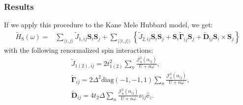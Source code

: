 \documentclass{beamer}
\newcommand{\bs}[1] {\boldsymbol{#1}}
\begin{document}

\begin{frame}
\frametitle{Results}
If we apply this procedure to the Kane Mele Hubbard model, we get:
\begin{align*}
\tilde{H}_{\text{S}}(\omega) =& \sum_{\langle i,j \rangle} \tilde{J}_{1,ij} \bs{S}_i\bs{S}_j + \sum_{\langle \langle i,j \rangle \rangle} \left\{ \tilde{J}_{2,ij}\bs{S}_i\bs{S}_j + \bs{S}_i \tilde{\bs{\Gamma}}_{ij} \bs{S}_j + \tilde{\bs{D}}_{ij} \bs{S}_i \times \bs{S}_j \right\}
\end{align*}
with the following renormalized spin interactions:
\begin{align*}
&\tilde{J}_{1(2),ij} = 2t_{1(2)}^2\sum_n\frac{\mathcal{J}_{n}^2(\alpha_{ij})}{U+n\omega}, \\
&\tilde{\bs{\Gamma}}_{ij} = 2\Delta^2 \text{diag}(-1,-1,1) \sum_n\frac{\mathcal{J}_{n}^2(\alpha_{ij})}{U+n\omega},\\
&\tilde{\bs{D}}_{ij} = 4 t_2 \Delta \sum_n\frac{\mathcal{J}_{n}^2(\alpha_{ij})}{U+n\omega} \nu_{ij} \hat{\mathrm{e}}_z.
\end{align*}
\end{frame}

\end{document}
